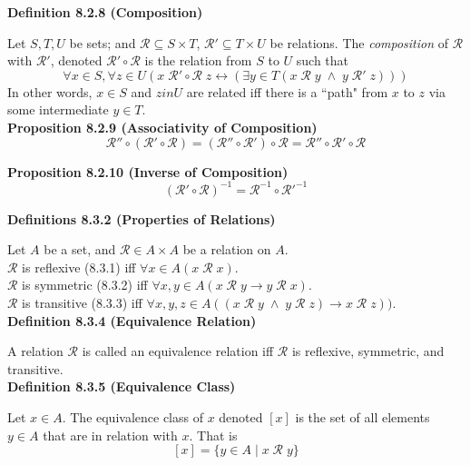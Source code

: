\documentclass[a4paper]{article}
\newcommand{\subheading}[1]{{\scriptsize\textbf{#1}}}
\begin{document}
\begin{multicols*}{4}
\subheading{Definition 8.2.8 (Composition)}

Let $S, T, U$ be sets; and $\mathcal{R} \subseteq S \times T$, $\mathcal{R}'
\subseteq T \times U$ be relations. The \textit{composition} of $\mathcal{R}$
with $\mathcal{R}'$, denoted $\mathcal{R}' \circ \mathcal{R}$ is the relation from
$S$ to $U$ such that
$$\forall x \in S, \forall z \in U (
  x\;\mathcal{R}' \circ \mathcal{R}\;z \leftrightarrow
    (\exists y \in T (x\;\mathcal{R}\;y\;\land\;y\;\mathcal{R}'\;z))
)$$
In other words, $x \in S$ and $z in U$ are related iff there is a ``path" from
$x$ to $z$ via some intermediate $y \in T$.\\

\subheading{Proposition 8.2.9 (Associativity of Composition)}
$$\mathcal{R}'' \circ (\mathcal{R}' \circ \mathcal{R}) =
  (\mathcal{R}'' \circ \mathcal{R}') \circ \mathcal{R} =
  \mathcal{R}'' \circ \mathcal{R}' \circ \mathcal{R}$$

\subheading{Proposition 8.2.10 (Inverse of Composition)}
$$(\mathcal{R}' \circ \mathcal{R})^{-1} =
  \mathcal{R}^{-1} \circ \mathcal{R}'^{-1}$$

\subheading{Definitions 8.3.2 (Properties of Relations)}

Let $A$ be a set, and $\mathcal{R} \in A \times A$ be a relation on $A$.\\

$\mathcal{R}$ is reflexive (8.3.1) iff $\forall x \in A (x\;\mathcal{R}\;x)$.\\

$\mathcal{R}$ is symmetric (8.3.2) iff $\forall x, y \in A (x\;\mathcal{R}\;y
\rightarrow y\;\mathcal{R}\;x)$.\\

$\mathcal{R}$ is transitive (8.3.3) iff $\forall x, y, z \in A
((x\;\mathcal{R}\;y\;\land\;y\;\mathcal{R}\;z)\rightarrow x\;\mathcal{R}\;z))$.\\

\subheading{Definition 8.3.4 (Equivalence Relation)}

A relation $\mathcal{R}$ is called an equivalence relation iff $\mathcal{R}$ is
reflexive, symmetric, and transitive.\\

\subheading{Definition 8.3.5 (Equivalence Class)}

Let $x \in A$. The equivalence class of $x$ denoted $[x]$ is the set of all
elements $y \in A$ that are in relation with $x$. That is
$$[x] = \{ y \in A\;|\; x\;\mathcal{R}\;y\}$$


\end{multicols*}
\end{document}
